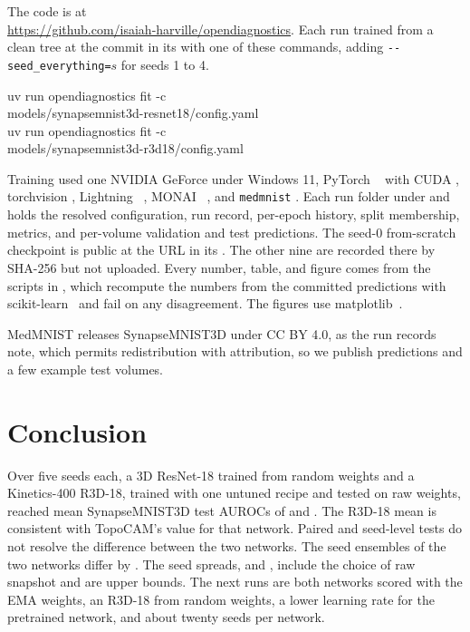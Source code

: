 \documentclass[conference]{IEEEtran}
\newif\ifanycitation
\let\citeAnyKey\cite
\renewcommand{\cite}{\global\anycitationtrue\citeAnyKey}
\begin{document}
The code is at\\
\url{https://github.com/isaiah-harville/opendiagnostics}. Each run trained from a clean
tree at the commit in its  with one of these commands, adding
\texttt{-{}-seed\_everything=}$s$ for seeds 1 to 4.
\begin{flushleft}\footnotesize\ttfamily
uv run opendiagnostics fit -c\\
\quad models/synapsemnist3d-resnet18/config.yaml\\
uv run opendiagnostics fit -c\\
\quad models/synapsemnist3d-r3d18/config.yaml
\end{flushleft}
Training used one NVIDIA GeForce \gpu{} under Windows 11, PyTorch
\torchVersion{}~\cite{paszke2019pytorch} with CUDA \cudaVersion{}, torchvision
\torchvisionVersion{}, Lightning \lightningVersion{}~\cite{falcon2020lightning}, MONAI
\monaiVersion{}~\cite{cardoso2022monai}, and \texttt{medmnist} \medmnistVersion{}. Each run
folder under  and
 holds the resolved configuration, run record,
per-epoch history, split membership, metrics, and per-volume validation and test
predictions. The seed-0 from-scratch checkpoint is public at the URL in its
. The other nine are recorded there by SHA-256 but not uploaded. Every
number, table, and figure comes from the scripts in , which
recompute the numbers from the committed predictions with scikit-learn~\cite{pedregosa2011sklearn}
and fail on any disagreement. The figures use matplotlib~\cite{hunter2007matplotlib}.

MedMNIST releases SynapseMNIST3D under CC BY 4.0, as the run records note, which permits
redistribution with attribution, so we publish predictions and a few example test volumes.

\section{Conclusion}

Over five seeds each, a 3D ResNet-18 trained from random
weights and a Kinetics-400 R3D-18, trained with one untuned recipe and tested on raw weights, reached mean SynapseMNIST3D test AUROCs of
\meanAurocScratch{} and \meanAurocKinetics{}. The R3D-18 mean is consistent with TopoCAM's
value for that network. Paired and seed-level tests do not resolve the difference between
the two networks. The seed ensembles of the two networks differ by \ensembleDiff{}. The seed spreads,
\rangeAurocScratch{} and \rangeAurocKinetics{}, include the choice of raw snapshot and are
upper bounds. The next runs are both networks scored with the
EMA weights, an R3D-18 from random weights, a lower learning rate for the pretrained network,
and about twenty seeds per network.
\end{document}
